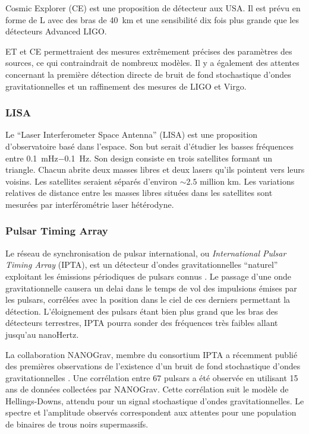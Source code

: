 Cosmic Explorer (CE) est une proposition de détecteur aux USA.
Il est prévu en forme de L avec des bras de \SI{40}{km} et une sensibilité dix fois plus grande que les détecteurs Advanced LIGO.

ET et CE permettraient des mesures extrêmement précises des paramètres des sources, ce qui contraindrait de nombreux modèles.
Il y a également des attentes concernant la première détection directe de bruit de fond stochastique d'ondes gravitationnelles et un raffinement des mesures de LIGO et Virgo.

\subsubsection*{LISA}
Le ``Laser Interferometer Space Antenna'' (LISA) \cite{LISA} est une proposition d'observatoire basé dans l'espace.
Son but serait d'étudier les basses fréquences entre \SI{0.1}{\milli\hertz}$-$\SI{0.1}{\hertz}.
Son design consiste en trois satellites formant un triangle.
Chacun abrite deux masses libres et deux lasers qu'ils pointent vers leurs voisins.
Les satellites seraient séparés d'environ $\sim 2.5$ million \si{km}.
Les variations relatives de distance entre les masses libres situées dans les satellites sont mesurées par interférométrie laser hétérodyne.


\subsubsection*{Pulsar Timing Array}
Le réseau de synchronisation de pulsar international, ou \textit{International Pulsar Timing Array} (IPTA), est un détecteur d'ondes gravitationnelles ``naturel'' exploitant les émissions périodiques de pulsars connus \cite{IPTA}.
Le passage d'une onde gravitationnelle causera un delai dans le temps de vol des impulsions émises par les pulsars, corrélées avec la position dans le ciel de ces derniers permettant la détection.
L'éloignement des pulsars étant bien plus grand que les bras des détecteurs terrestres, IPTA pourra sonder des fréquences très faibles allant jusqu'au nanoHertz.

La collaboration NANOGrav, membre du consortium IPTA a récemment publié des premières observations de l'existence d'un bruit de fond stochastique d'ondes gravitationnelles \cite{nanograv}.
Une corrélation entre 67 pulsars a été observée en utilisant 15 ans de données collectées par NANOGrav.
Cette corrélation suit le modèle de Hellings-Downs, attendu pour un signal stochastique d'ondes gravitationnelles.
Le spectre et l'amplitude observés correspondent aux attentes pour une population de binaires de trous noirs supermassifs.